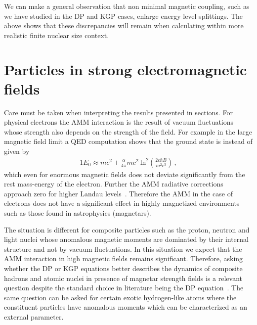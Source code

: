 We can make a general observation that non minimal magnetic coupling, such as we have studied in the DP and KGP cases, enlarge energy level splittings. The above shows that these discrepancies will remain when calculating within more realistic finite nuclear size context.

















\section{Particles in strong electromagnetic fields}
\label{sec:sb}
Care must be taken when interpreting the results presented in sections. For physical electrons the AMM interaction is the result of vacuum fluctuations whose strength also depends on the strength of the field. For example in the large magnetic field limit a QED computation shows that the ground state is instead of  given by~\cite{Jancovici:1969exc}
\begin{alignat}{1} \label{vacfl01}
E_{0}\approx mc^{2}+\frac{\alpha}{4\pi}mc^{2}\ \mathrm{ln}^{2}\left(\frac{2e\hbar B}{m^{2}c^{3}}\right)\,,
\end{alignat}
which even for enormous magnetic fields does not deviate significantly from the rest mass-energy of the electron. Further the AMM radiative corrections approach zero for higher Landau levels~\citep{Ferrer:2015wca,Hackebill:2022uxv}. Therefore the AMM in the case of electrons does not have a significant effect in highly magnetized environments such as those found in astrophysics (magnetars).

The situation is different for composite particles such as the proton, neutron and light nuclei whose anomalous magnetic moments are dominated by their internal structure and not by vacuum fluctuations. In this situation we expect that the AMM interaction in high magnetic fields remains significant. Therefore, asking whether the DP or KGP equations better describes the dynamics of composite hadrons and atomic nuclei in presence of magnetar strength fields is a relevant question despite the standard choice in literature being the DP equation~\citep{Broderick:2000pe}. The same question can be asked for certain exotic hydrogen-like atoms where the constituent particles have anomalous moments which can be characterized as an external parameter. 

